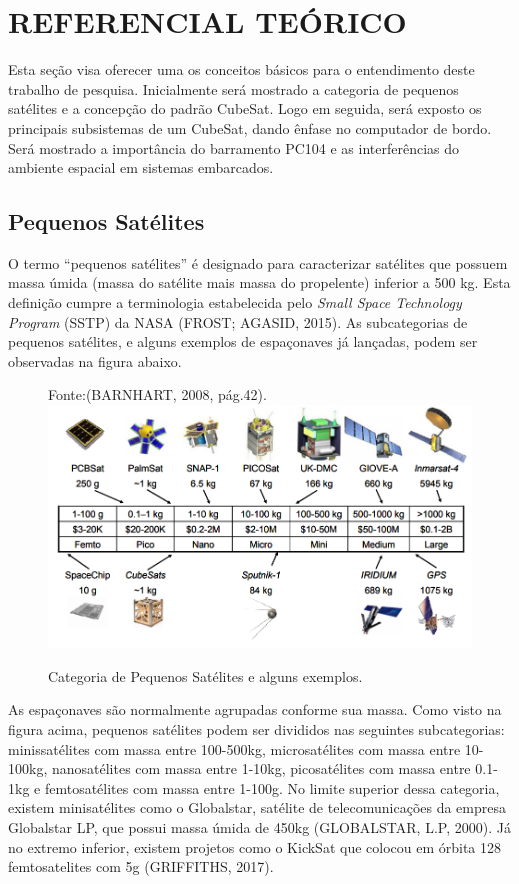 \chapter[REFERENCIAL TEÓRICO]{REFERENCIAL TEÓRICO}

Esta seção visa oferecer uma os conceitos básicos para o entendimento deste trabalho de pesquisa. Inicialmente será mostrado a categoria de pequenos satélites e a concepção do padrão CubeSat. Logo em seguida, será exposto os principais subsistemas de um CubeSat, dando ênfase no computador de bordo. Será mostrado a importância do barramento PC104 e as interferências do ambiente espacial em sistemas embarcados.


\section{Pequenos Satélites}

O termo “pequenos satélites” é designado para caracterizar satélites que possuem massa úmida (massa do satélite mais massa do propelente) inferior a 500 kg. Esta definição cumpre a terminologia estabelecida pelo \textit{Small Space Technology Program} (SSTP) da NASA (FROST; AGASID, 2015). As subcategorias de pequenos satélites, e alguns exemplos de espaçonaves já lançadas, podem ser observadas na figura abaixo.


\begin{figure}[h]
	\centering
    
    Fonte:(BARNHART, 2008, pág.42).
	\includegraphics[keepaspectratio=true,scale=0.55]{figuras/categoria_satellite.PNG}
	\caption{Categoria de Pequenos Satélites e alguns exemplos.}
	\label{fig02}
\end{figure}

As espaçonaves são normalmente agrupadas conforme sua massa. Como visto na figura acima, pequenos satélites podem ser divididos nas seguintes subcategorias: minissatélites com massa entre 100-500kg, microsatélites com massa entre 10-100kg, nanosatélites com massa entre 1-10kg, picosatélites com massa entre 0.1-1kg e femtosatélites com massa entre 1-100g. No limite superior dessa categoria, existem minisatélites como o Globalstar, satélite de telecomunicações da empresa Globalstar LP, que possui massa úmida de 450kg (GLOBALSTAR, L.P, 2000). Já no extremo inferior, existem projetos como o KickSat que colocou em órbita 128 femtosatelites  com 5g (GRIFFITHS, 2017).

